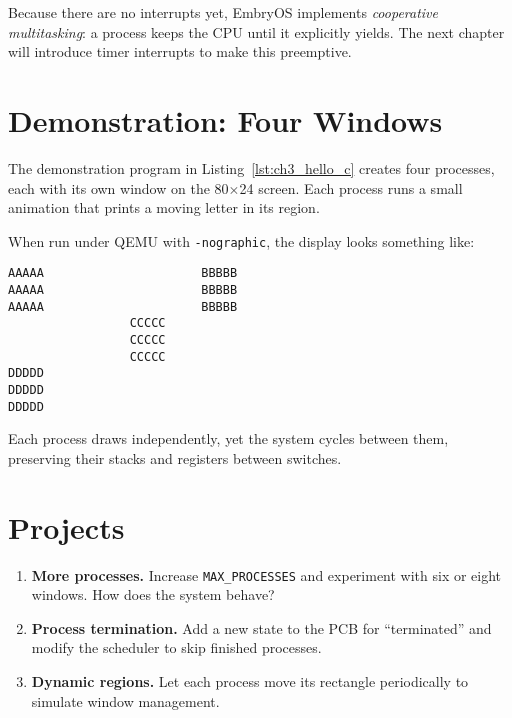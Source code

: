 Because there are no interrupts yet, EmbryOS implements
\emph{cooperative multitasking}: a process keeps the CPU until it explicitly
yields.  The next chapter will introduce timer interrupts to make this
preemptive.

\section{Demonstration: Four Windows}

The demonstration program in Listing~\ref{lst:ch3_hello_c} creates four processes,
each with its own window on the 80$\times$24 screen.  Each process runs a small
animation that prints a moving letter in its region.

\begin{figure}[H]
\centering
\begin{minipage}{0.9\textwidth}

\end{minipage}
\end{figure}

When run under QEMU with \texttt{-nographic}, the display looks something like:

\begin{verbatim}
AAAAA                      BBBBB
AAAAA                      BBBBB
AAAAA                      BBBBB
                 CCCCC
                 CCCCC
                 CCCCC
DDDDD
DDDDD
DDDDD
\end{verbatim}

Each process draws independently, yet the system cycles between them,
preserving their stacks and registers between switches.

\section*{Projects}

\begin{enumerate}
  \item \textbf{More processes.}
        Increase \texttt{MAX\_PROCESSES} and experiment with six or eight
        windows.  How does the system behave?
  \item \textbf{Process termination.}
        Add a new state to the PCB for ``terminated'' and modify the scheduler
        to skip finished processes.
  \item \textbf{Dynamic regions.}
        Let each process move its rectangle periodically to simulate window
        management.
\end{enumerate}
